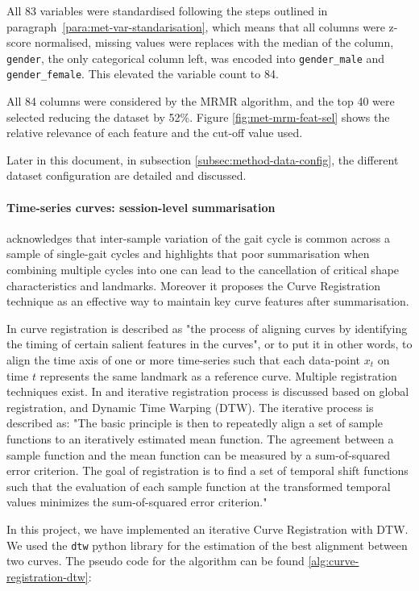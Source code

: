 All 83 variables were standardised following the steps outlined in paragraph~\ref{para:met-var-standarisation}, which means that all columns were z-score normalised, missing values were replaces with the median of the column, \texttt{gender}, the only categorical column left, was encoded into \texttt{gender\_male} and \texttt{gender\_female}. This elevated the variable count to 84.

All 84 columns were considered by the MRMR algorithm, and the top 40 were selected reducing the dataset by 52\%. Figure \ref{fig:met-mrm-feat-sel} shows the relative relevance of each feature and the cut-off value used.

Later in this document, in subsection \ref{subsec:method-data-config}, the different dataset configuration are detailed and discussed.

\paragraph{Time-series curves: session-level summarisation}
\citet{Chau2005} acknowledges that inter-sample variation of the gait cycle is common across a sample of single-gait cycles and highlights that poor summarisation when combining multiple cycles into one can lead to the cancellation of critical shape characteristics and landmarks. Moreover it proposes the Curve Registration technique \citep{Ramsay1998} as an effective way to maintain key curve features after summarisation.

In \citet{Ramsay1998} curve registration is described as "the process of aligning curves by identifying the timing of certain salient features in the curves", or to put it in other words, to align the time axis of one or more time-series such that each data-point $x_t$ on time $t$ represents the same landmark as a reference curve. Multiple registration techniques exist. In \citet{Chau2005} and iterative registration process is discussed based on global registration, and Dynamic Time Warping (DTW). The iterative process is described as: "The basic principle is then to repeatedly align a set of sample functions to an iteratively estimated mean function. The agreement between a sample function and the mean function can be measured by a sum-of-squared error criterion. The goal of registration is to find a set of temporal shift functions such that the evaluation of each sample function at the transformed temporal values minimizes the sum-of-squared error criterion."

In this project, we have implemented an iterative Curve Registration with DTW. We used the \texttt{dtw} python library \citet{Giorgino2009} for the estimation of the best alignment between two curves. The pseudo code for the algorithm can be found \ref{alg:curve-registration-dtw}:

